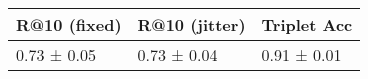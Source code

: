 \begin{tabular}{lll}
\toprule
R@10 (fixed) & R@10 (jitter) & Triplet Acc \\
\midrule
 0.73 ± 0.05 &   0.73 ± 0.04 & 0.91 ± 0.01 \\
\bottomrule
\end{tabular}

